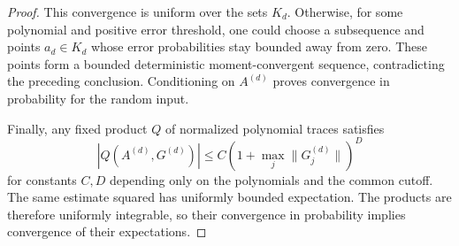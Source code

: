 \begin{proof}
This convergence is uniform over the sets $K_d$. Otherwise, for some
polynomial and positive error threshold, one could choose a subsequence
and points $a_d\in K_d$ whose error probabilities stay bounded away
from zero. These points form a bounded deterministic moment-convergent
sequence, contradicting the preceding conclusion. Conditioning on
$A^{(d)}$ proves convergence in probability for the random input.

Finally, any fixed product $Q$ of normalized polynomial traces satisfies
\[
 |Q(A^{(d)},G^{(d)})|
 \leq C(1+\max_j\|G_j^{(d)}\|)^D
\]
for constants $C,D$ depending only on the polynomials and the common
cutoff. The same estimate squared has uniformly bounded expectation.
The products are therefore uniformly integrable, so their convergence
in probability implies convergence of their expectations.
\end{proof}

